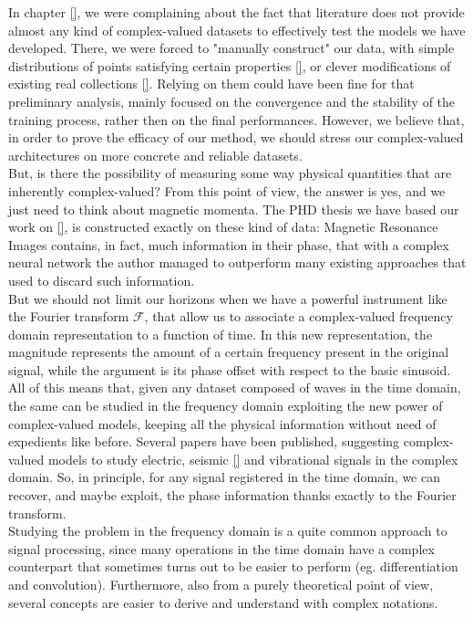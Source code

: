 \documentclass[../main.tex]{subfiles}
\begin{document}
In chapter \ref{}, we were complaining about the fact that literature does not provide almost any kind of complex-valued datasets to effectively test the models we have developed. There, we were forced to "manually construct" our data, with simple distributions of points satisfying certain properties \ref{}, or clever modifications of existing real collections \ref{}. Relying on them could have been fine for that preliminary analysis, mainly focused on the convergence and the stability of the training process, rather then on the final performances. However, we believe that, in order to prove the efficacy of our method, we should stress our complex-valued architectures on more concrete and reliable datasets.\\
But, is there the possibility of measuring some way physical quantities that are inherently complex-valued? From this point of view, the answer is yes, and we just need to think about magnetic momenta. The PHD thesis we have based our work on \ref{}, is constructed exactly on these kind of data: Magnetic Resonance Images contains, in fact, much information in their phase, that with a complex neural network the author managed to outperform many existing approaches that used to discard such information.\\
But we should not limit our horizons when we have a powerful instrument like the Fourier transform $\mathcal{F}$, that allow us to associate a complex-valued frequency domain representation to a function of time. In this new representation, the magnitude represents the amount of a certain frequency present in the original signal, while the argument is its phase offset with respect to the basic sinusoid. All of this means that, given any dataset composed of waves in the time domain, the same can be studied in the frequency domain exploiting the new power of complex-valued models, keeping all the physical information without need of expedients like before. Several papers have been published, suggesting complex-valued models to study electric, seismic \ref{} and vibrational signals in the complex domain. So, in principle, for any signal registered in the time domain, we can recover, and maybe exploit, the phase information thanks exactly to the Fourier transform.\\
Studying the problem in the frequency domain is a quite common approach to signal processing, since many operations in the time domain have a complex counterpart that sometimes turns out to be easier to perform (eg. differentiation and convolution). Furthermore, also from a purely theoretical point of view, several concepts are easier to derive and understand with complex notations.\\
\end{document}
